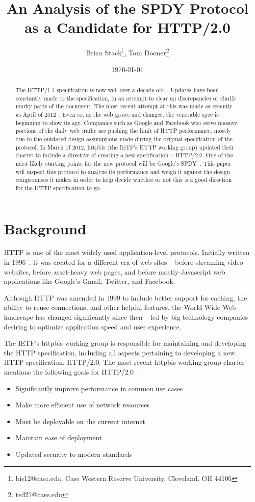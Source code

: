 \documentclass[10pt,letterpaper,notitlepage]{article}
\title{An Analysis of the SPDY Protocol as a Candidate for HTTP/2.0}
\date{\today}
\author{Brian Stack\thanks{ bis12@case.edu, Case Western Reserve University,
Cleveland, OH 44106}, Tom Dooner\thanks{ ted27@case.edu }}
\begin{document}
\maketitle
\setcounter{tocdepth}{1}
\tableofcontents
\begin{abstract}
The HTTP/1.1 specification is now well over a decade old~\cite{rfc2616}. Updates
have been constantly made to the specification, in an attempt to clear up
discrepancies or clarify murky parts of the document.  The most recent attempt
at this was made as recently as April of 2012~\cite{rfc6585}.  Even so, as the web grows
and changes, the venerable spec is beginning to show its age.  Companies such as
Google and Facebook who serve massive portions of the daily web traffic are
pushing the limit of HTTP performance, mostly due to the outdated design
assumptions made during the original specification of the protocol.  In March of
2012, httpbis (the IETF's HTTP working group) updated their charter to
include a directive of creating a new specification -- HTTP/2.0.  One of the
most likely starting points for the new protocol will be Google's
SPDY~\cite{spdyspec}.  This paper will inspect this protocol to analyze its
performance and weigh it against the design compromises it makes in order to
help decide whether or not this is a good direction for the HTTP specification
to go.
\end{abstract}

\section{Background}
\label{sec:background}
HTTP is one of the most widely used application-level protocols. Initially
written in 1996~\cite{http1rfc}, it was created for a different era of web
sites -- before streaming video websites, before asset-heavy web pages, and
before mostly-Javascript web applications like Google's Gmail, Twitter, and
Facebook.

Although HTTP was amended in 1999 to include better support for caching, the
ability to reuse connections, and other helpful features, the World Wide Web
landscape has changed significantly since then -- led by big technology
companies desiring to optimize application speed and user experience.

The IETF's httpbis working group is responsible for maintaining and developing
the HTTP specification, including all aspects pertaining to developing a new
HTTP specification, HTTP/2.0. The most recent httpbis working group charter
mentions the following goals for HTTP/2.0~\cite{httpbis-charter}:
\begin{itemize}
\item Significantly improve performance in common use cases
\item Make more efficient use of network resources
\item Must be deployable on the current internet
\item Maintain ease of deployment
\item Updated security to modern standards
\end{itemize}
\end{document}
